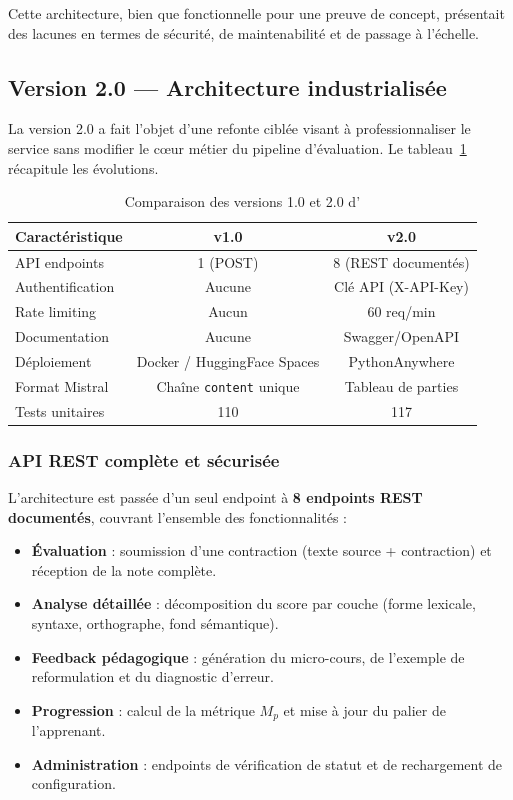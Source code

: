 Cette architecture, bien que fonctionnelle pour une preuve de concept, présentait des lacunes en termes de sécurité, de maintenabilité et de passage à l'échelle.

\subsection{Version 2.0 — Architecture industrialisée}

La version 2.0 a fait l'objet d'une refonte ciblée visant à professionnaliser le service sans modifier le cœur métier du pipeline d'évaluation. Le tableau~\ref{tab:evolution-v1-v2} récapitule les évolutions.

\begin{table}[h]
\centering
\small
\renewcommand{\arraystretch}{1.4}
\begin{tabular}{lcc}
\toprule
\textbf{Caractéristique} & \textbf{v1.0} & \textbf{v2.0} \\
\midrule
API endpoints & 1 (POST) & 8 (REST documentés) \\
Authentification & Aucune & Clé API (X-API-Key) \\
Rate limiting & Aucun & 60 req/min \\
Documentation & Aucune & Swagger/OpenAPI \\
Déploiement & Docker / HuggingFace Spaces & PythonAnywhere \\
Format Mistral & Chaîne \texttt{content} unique & Tableau de parties \\
Tests unitaires & 110 & 117 \\
\bottomrule
\end{tabular}
\caption{Comparaison des versions 1.0 et 2.0 d'\AZIZA}
\label{tab:evolution-v1-v2}
\end{table}

\subsubsection{API REST complète et sécurisée}

L'architecture est passée d'un seul endpoint à \textbf{8 endpoints REST documentés}, couvrant l'ensemble des fonctionnalités :

\begin{itemize}
    \item \textbf{Évaluation} : soumission d'une contraction (texte source + contraction) et réception de la note complète.
    \item \textbf{Analyse détaillée} : décomposition du score par couche (forme lexicale, syntaxe, orthographe, fond sémantique).
    \item \textbf{Feedback pédagogique} : génération du micro-cours, de l'exemple de reformulation et du diagnostic d'erreur.
    \item \textbf{Progression} : calcul de la métrique \(M_p\) et mise à jour du palier de l'apprenant.
    \item \textbf{Administration} : endpoints de vérification de statut et de rechargement de configuration.
\end{itemize}


